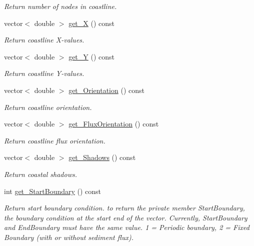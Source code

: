 \begin{DoxyCompactItemize}
\begin{DoxyCompactList}\small\item\em Return number of nodes in coastline. \end{DoxyCompactList}\item 
vector$<$ double $>$ \hyperlink{classCoastline_ae9b780d557c0f40a1b3cb1a33cb8aa8b}{get\-\_\-\-X} () const 
\begin{DoxyCompactList}\small\item\em Return coastline X-\/values. \end{DoxyCompactList}\item 
vector$<$ double $>$ \hyperlink{classCoastline_a239c8c4e6937f3377818d3173c79a07b}{get\-\_\-\-Y} () const 
\begin{DoxyCompactList}\small\item\em Return coastline Y-\/values. \end{DoxyCompactList}\item 
vector$<$ double $>$ \hyperlink{classCoastline_a81187adcf6c1e4dc57649bca73d59fa0}{get\-\_\-\-Orientation} () const 
\begin{DoxyCompactList}\small\item\em Return coastline orientation. \end{DoxyCompactList}\item 
vector$<$ double $>$ \hyperlink{classCoastline_a530b063c59daef1c81bb1de4eb4962e9}{get\-\_\-\-Flux\-Orientation} () const 
\begin{DoxyCompactList}\small\item\em Return coastline flux orientation. \end{DoxyCompactList}\item 
vector$<$ double $>$ \hyperlink{classCoastline_abf2c2556a4b9e26291e8abf053d605ac}{get\-\_\-\-Shadows} () const 
\begin{DoxyCompactList}\small\item\em Return coastal shadows. \end{DoxyCompactList}\item 
int \hyperlink{classCoastline_ab724bac5ff022c81a19184afce61b68d}{get\-\_\-\-Start\-Boundary} () const 
\begin{DoxyCompactList}\small\item\em Return start boundary condition.  to return the private member Start\-Boundary, the boundary condition at the start end of the vector. Currently, Start\-Boundary and End\-Boundary must have the same value. 1 = Periodic boundary, 2 = Fixed Boundary (with or without sediment flux). \end{DoxyCompactList}\item 

\end{DoxyCompactItemize}
